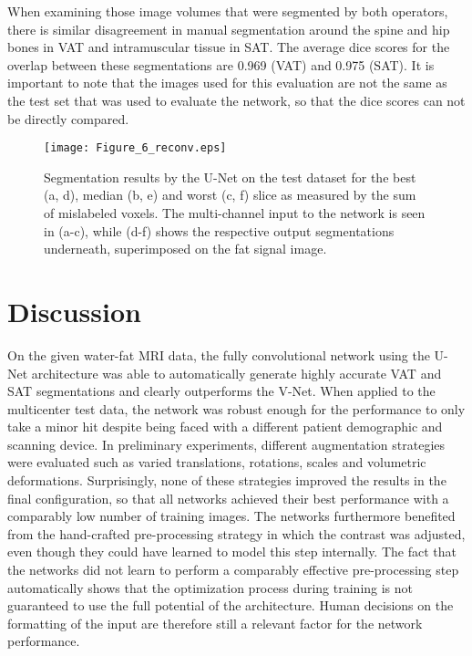 \documentclass[10pt,letterpaper]{article}
\begin{document}
	When examining those image volumes that were segmented by both operators, there is similar disagreement in manual segmentation around the spine and hip bones in VAT and intramuscular tissue in SAT. The average dice scores for the overlap between these segmentations are 0.969 (VAT) and 0.975 (SAT). It is important to note that the images used for this evaluation are not the same as the test set that was used to evaluate the network, so that the dice scores can not be directly compared.	
		
	\begin{figure}[H] %
		
		
		\texttt{[image: Figure\_6\_reconv.eps]}
		
		\caption{Segmentation results by the U-Net on the test dataset for the best (a, d), median (b, e) and worst (c, f) slice as measured by the sum of mislabeled voxels. The multi-channel input to the network is seen in (a-c), while (d-f) shows the respective output segmentations underneath, superimposed on the fat signal image.}
		
		\label{fig6} %
		
	\end{figure}
	
	
	\section*{Discussion}
	
	On the given water-fat MRI data, the fully convolutional network using the U-Net architecture was able to automatically generate highly accurate VAT and SAT segmentations and clearly outperforms the V-Net. When applied to the multicenter test data, the network was robust enough for the performance to only take a minor hit despite being faced with a different patient demographic and scanning device.
	In preliminary experiments, different augmentation strategies were evaluated such as varied translations, rotations, scales and volumetric deformations. Surprisingly, none of these strategies improved the results in the final configuration, so that all networks achieved their best performance with a comparably low number of training images. The networks furthermore benefited from the hand-crafted pre-processing strategy in which the contrast was adjusted, even though they could have learned to model this step internally. The fact that the networks did not learn to perform a comparably effective pre-processing step automatically shows that the optimization process during training is not guaranteed to use the full potential of the architecture. Human decisions on the formatting of the input are therefore still a relevant factor for the network performance. \\
	
\end{document}
